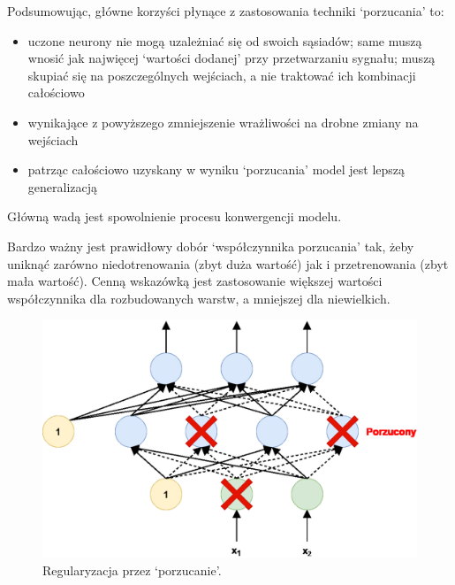 \documentclass[a4paper,11pt]{article}
\begin{document}
    \bigskip

    Podsumowując, główne korzyści płynące z zastosowania techniki `porzucania' to\cite{UczenieMaszynowe2018}:
    \begin{itemize}
        \item uczone neurony nie mogą uzależniać się od swoich sąsiadów; same muszą wnosić jak najwięcej `wartości dodanej' przy przetwarzaniu sygnału; muszą skupiać się na poszczególnych wejściach, a nie traktować ich kombinacji całościowo
        \item wynikające z powyższego zmniejszenie wrażliwości na drobne zmiany na wejściach
        \item patrząc całościowo uzyskany w wyniku `porzucania' model jest lepszą generalizacją
    \end{itemize}

    \smallskip

    Główną wadą jest spowolnienie procesu konwergencji modelu\cite{UczenieMaszynowe2018}.

    \bigskip

    Bardzo ważny jest prawidłowy dobór `współczynnika porzucania' tak, żeby uniknąć zarówno niedotrenowania (zbyt duża wartość) jak i przetrenowania (zbyt mała wartość). Cenną wskazówką jest zastosowanie większej wartości współczynnika dla rozbudowanych warstw, a mniejszej dla niewielkich.

    \bigskip

    \begin{figure}[H]
        \label{fig:dropout}
        \centering
        \includegraphics[width=\textwidth]{dropout}
        \caption{Regularyzacja przez `porzucanie'\cite{UczenieMaszynowe2018}.}
    \end{figure}
\end{document}
